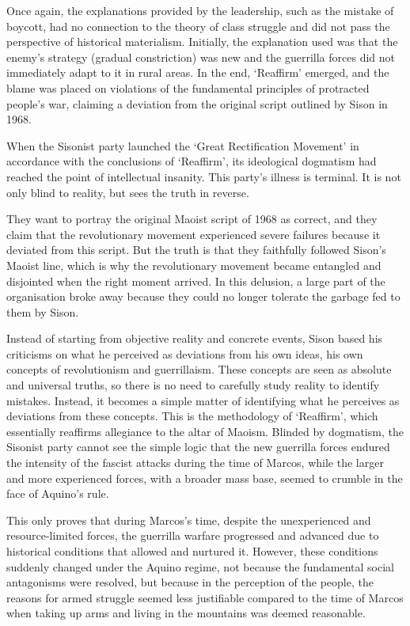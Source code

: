 Once again, 
the explanations provided by the leadership, 
such as the mistake of boycott, 
had no connection to the theory of class struggle 
and did not pass the perspective of historical materialism. 
Initially, 
the explanation used was that the enemy's strategy (gradual constriction) 
was new and the guerrilla forces did not immediately adapt to it in rural areas. 
In the end, `Reaffirm' emerged, 
and the blame was placed on violations 
of the fundamental principles of protracted people's war, 
claiming a deviation from the original script outlined by Sison in 1968.

When the Sisonist party launched 
the `Great Rectification Movement' 
in accordance with the conclusions of `Reaffirm', 
its ideological dogmatism had reached 
the point of intellectual insanity. 
This party's illness is terminal. 
It is not only blind to reality, 
but sees the truth in reverse.

They want to portray the original Maoist script of 1968 as correct, 
and they claim that the revolutionary movement 
experienced severe failures 
because it deviated from this script. 
But the truth is that they faithfully followed Sison's Maoist line, 
which is why the revolutionary movement 
became entangled and disjointed 
when the right moment arrived. 
In this delusion, 
a large part of the organisation broke away 
because they could no longer tolerate the garbage fed to them by Sison.

Instead of starting from objective reality and concrete events, 
Sison based his criticisms 
on what he perceived as deviations 
from his own ideas, 
his own concepts of revolutionism and guerrillaism. 
These concepts are seen as absolute and universal truths, 
so there is no need to carefully study reality to identify mistakes. 
Instead, it becomes a simple matter of identifying 
what he perceives as deviations from these concepts. 
This is the methodology of `Reaffirm', 
which essentially reaffirms allegiance to the altar of Maoism. 
Blinded by dogmatism, 
the Sisonist party cannot see the simple logic 
that the new guerrilla forces endured 
the intensity of the fascist attacks 
during the time of Marcos, 
while the larger and more experienced forces, 
with a broader mass base, 
seemed to crumble in the face of Aquino's rule.

This only proves that during Marcos's time, 
despite the unexperienced and resource-limited forces, 
the guerrilla warfare progressed and advanced 
due to historical conditions that allowed and nurtured it. 
However, these conditions suddenly changed under the Aquino regime, 
not because the fundamental social antagonisms were resolved, 
but because in the perception of the people, 
the reasons for armed struggle seemed less justifiable 
compared to the time of Marcos 
when taking up arms and living in the mountains was deemed reasonable.

